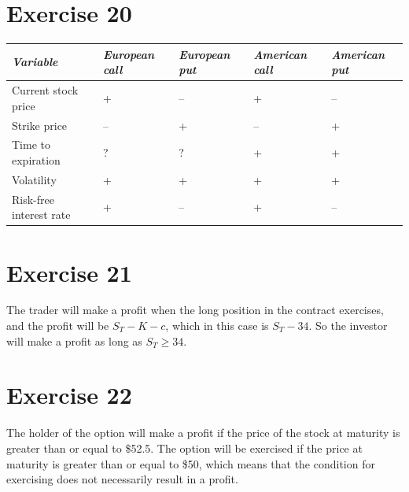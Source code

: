 \documentclass{article}
\begin{document}
\section*{Exercise 20}
\begin{tabular}{|l|l|l|l|l|}\hline
    {\em Variable} & {\em European call} & {\em European put} & {\em American call} &
    {\em American put}\\\hline
    Current stock price & + & – & + & – \\\hline
    Strike price & – & + & – & + \\\hline
    Time to expiration & ?&?&+&+\\\hline
    Volatility &+&+&+&+\\\hline
    Risk-free interest rate &+&–&+&–\\\hline
\end{tabular}

\section*{Exercise 21}

The trader will make a profit when the long position in the contract exercises, and the profit will be
$S_T - K - c$, which in this case is $S_T - 34$. So the investor will make a profit as long as $S_T \geq 34$.

\section*{Exercise 22}
The holder of the option will make a profit if the price of the stock at maturity is greater than or equal to
\$52.5. The option will be exercised if the price at maturity is greater than or equal to \$50, which means that
the condition for exercising does not necessarily result in a profit.

\begin{center}
\end{center}
\end{document}
